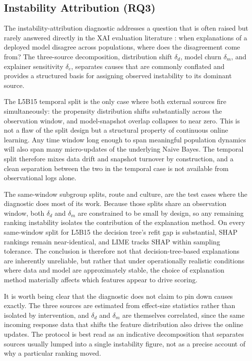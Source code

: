 \documentclass[oneside]{memoir} %
\begin{document}
\subsection{Instability Attribution (RQ3)}

The instability-attribution diagnostic addresses a question that is often raised but rarely answered directly in the XAI evaluation literature \parencite{vilone_explainable_2020, molnar_interpretable_2025}: when explanations of a deployed model disagree across populations, where does the disagreement come from? The three-source decomposition, distribution shift $\delta_d$, model churn $\delta_m$, and explainer sensitivity $\delta_e$, separates causes that are commonly conflated and provides a structured basis for assigning observed instability to its dominant source.

The L5B15 temporal split is the only case where both external sources fire simultaneously: the propensity distribution shifts substantially across the observation window, and model-snapshot overlap collapses to near zero. This is not a flaw of the split design but a structural property of continuous online learning. Any time window long enough to span meaningful population dynamics will also span many micro-updates of the underlying Naive Bayes. The temporal split therefore mixes data drift and snapshot turnover by construction, and a clean separation between the two in the temporal case is not available from observational logs alone.

The same-window subgroup splits, route and culture, are the test cases where the diagnostic does most of its work. Because those splits share an observation window, both $\delta_d$ and $\delta_m$ are constrained to be small by design, so any remaining ranking instability isolates the contribution of the explanation method. On every same-window split for L5B15 the decision tree's refit gap is substantial, SHAP rankings remain near-identical, and LIME tracks SHAP within sampling tolerance. The conclusion is therefore not that decision-tree-based explanations are inherently unreliable, but rather that under operationally realistic conditions where data and model are approximately stable, the choice of explanation method materially affects which features appear to drive scoring.

It is worth being clear that the diagnostic does not claim to pin down causes exactly. The three sources are estimated from effect-size statistics rather than isolated by intervention, and $\delta_d$ and $\delta_m$ are themselves correlated, since the same incoming response data that shifts the feature distribution also drives the online updates. The protocol is best read as an indicative decomposition that separates sources usually lumped into a single instability figure, not as a precise account of why a particular ranking moved.
\end{document}
